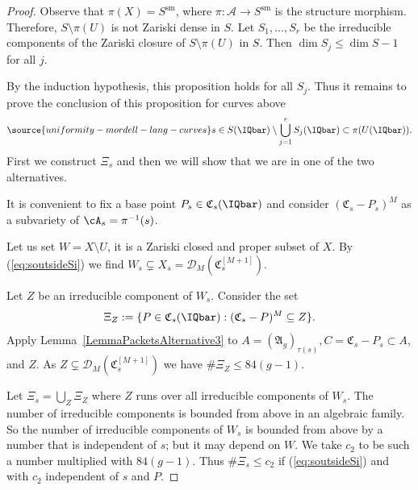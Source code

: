 \begin{proof}
Observe that $\pi(X)=S^{\mathrm{sm}}$, where
$\pi\colon \mathcal{A} \rightarrow S^{\mathrm{sm}}$
is the structure
morphism.
Therefore, $S \setminus \pi(U)$ is not Zariski dense in
$S$. %
Let $S_1,\ldots, S_r$ be the irreducible components of the
Zariski closure of $S\setminus \pi(U)$ in $S$. Then $\dim S_j \le \dim
S - 1$ for all $j$.

By the induction hypothesis, this proposition holds for all $S_j$. Thus it
remains to prove the conclusion of this proposition for curves above
\begin{equation}
\label{eq:soutsideSi}
\source{uniformity-mordell-lang-curves}
s \in S(\IQbar) \setminus \bigcup_{j=1}^r S_j(\IQbar) \subset \pi(U(\IQbar)).
\end{equation}
 First we construct $\Xi_s$ and then
we will show that we are in one of the two alternatives.

It is convenient to fix a base point $P_s\in
\mathfrak{C}_s(\IQbar)$ and consider $(\mathfrak{C}_s - P_s)^M$
as a subvariety of $\cA_s = \pi^{-1}(s)$.

Let us set $W = X\setminus U$, it is a Zariski closed and proper
subset of $X$.  By (\ref{eq:soutsideSi}) we find  $W_s\subsetneq X_s = \mathscr{D}_M(\mathfrak{C}_s^{[M+1]})$.

Let $Z$ be an irreducible component of
$W_s$.
Consider the set
\[
\Xi_Z := \{ P \in \mathfrak{C}_s(\IQbar) : ( \mathfrak{C}_s- P)^M
\subseteq Z \}. %
\]
Apply Lemma~\ref{LemmaPacketsAlternative3} to $A =
(\mathfrak{A}_g)_{\tau(s)}, C=\mathfrak{C}_s-P_s\subset A$, and $Z$. As $Z\subsetneq
\mathscr{D}_M(\mathfrak{C}_s^{[M+1]})$  we have $\#\Xi_Z \le 84(g-1)$.

Let $\Xi_s = \bigcup_Z \Xi_Z$ where $Z$ runs over all irreducible
components of $W_s$. The number of irreducible components  is
bounded from above in an algebraic family.
So the number of irreducible components of $W_s$
is bounded from above by a number that  is independent of $s$; but it may depend on $W$.  We take
$c_2$ to be such a number multiplied with $84(g-1)$. Thus
$\#\Xi_s \le c_2$ if (\ref{eq:soutsideSi}) and with $c_2$ independent
of $s$ and $P$.


\end{proof}
